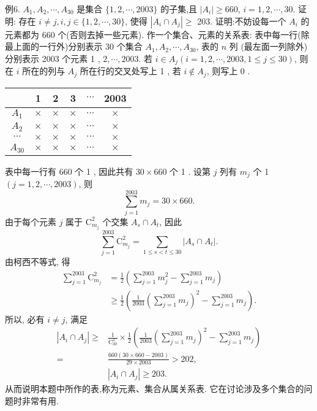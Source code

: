 例6. $A_1, A_2, \cdots, A_{30}$ 是集合 $\{1,2, \cdots, 2003\}$ 的子集,且 $\left|A_i\right| \geqslant 660$, $i=1,2, \cdots, 30$. 证明: 存在 $i \neq j, i, j \in\{1,2, \cdots, 30\}$, 使得 $\left|A_i \cap A_j\right| \geqslant$ 203.
证明:不妨设每一个 $A_i$ 的元素都为 660 个(否则去掉一些元素). 作一个集合、元素的关系表: 表中每一行(除最上面的一行外)分别表示 30 个集合 $A_1, A_2, \cdots, A_{30}$, 表的 $n$ 列 (最左面一列除外) 分别表示 2003 个元素 1 , $2, \cdots, 2003$. 若 $i \in A_j(i=1,2, \cdots, 2003,1 \leqslant j \leqslant 30)$, 则在 $i$ 所在的列与 $A_j$ 所在行的交叉处写上 1 , 若 $i \notin A_j$, 则写上 0 .
\begin{tabular}{c|ccccc} 
& 1 & 2 & 3 & $\cdots$ & 2003 \\
\hline$A_1$ & $\times$ & $\times$ & $\times$ & $\cdots$ & $\times$ \\
$A_2$ & $\times$ & $\times$ & $\times$ & $\cdots$ & $\times$ \\
$\cdots$ & $\times$ & $\times$ & $\times$ & $\cdots$ & $\times$ \\
$A_{30}$ & $\times$ & $\times$ & $\times$ & $\cdots$ & $\times$
\end{tabular}
表中每一行有 660 个 1 , 因此共有 $30 \times 660$ 个 1 . 设第 $j$ 列有 $m_j$ 个 1 $(j=1,2, \cdots, 2003)$, 则
$$
\sum_{j=1}^{2003} m_j=30 \times 660 .
$$
由于每个元素 $j$ 属于 $\mathrm{C}_{m_j}^2$ 个交集 $A_s \cap A_t$, 因此
$$
\sum_{j=1}^{2003} \mathrm{C}_{m_j}^2=\sum_{1 \leqslant s<t \leqslant 30}\left|A_s \cap A_t\right| .
$$
由柯西不等式, 得
$$
\begin{aligned}
\sum_{j=1}^{2003} \mathrm{C}_{m_j}^2 & =\frac{1}{2}\left(\sum_{j=1}^{2003} m_j^2-\sum_{j=1}^{2003} m_j\right) \\
& \geqslant \frac{1}{2}\left(\frac{1}{2003}\left(\sum_{j=1}^{2003} m_j\right)^2-\sum_{j=1}^{2003} m_j\right) .
\end{aligned}
$$
所以, 必有 $i \neq j$, 满足
$$
\begin{aligned}
\left|A_i \cap A_j\right| \geqslant & \frac{1}{\mathrm{C}_{30}^2} \times \frac{1}{2}\left(\frac{1}{2003}\left(\sum_{j=1}^{2003} m_j\right)^2-\sum_{j=1}^{2003} m_j\right) \\
= & \frac{660(30 \times 660-2003)}{29 \times 2003}>202, \\
& \left|A_i \cap A_j\right| \geqslant 203 .
\end{aligned}
$$
从而说明本题中所作的表,称为元素、集合从属关系表.
它在讨论涉及多个集合的问题时非常有用.



